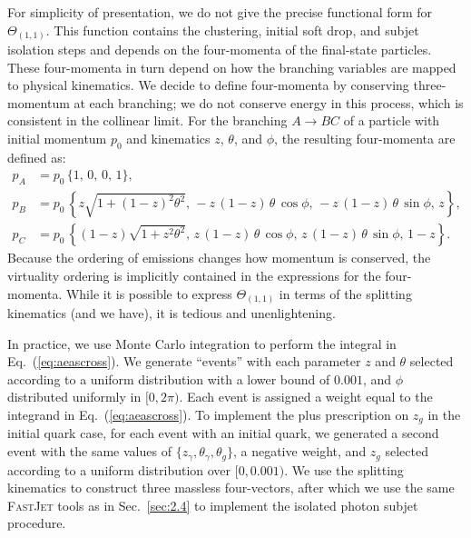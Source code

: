 \documentclass[a4paper,11pt]{article}
\DeclareRobustCommand{\Sec}[1]{Sec.~\ref{#1}}
\DeclareRobustCommand{\Eq}[1]{Eq.~(\ref{#1})}
\begin{document}
For simplicity of presentation, we do not give the precise functional form for $\Theta_{(1,1)}$.
%
This function contains the clustering, initial soft drop, and subjet isolation steps and depends on the four-momenta of the final-state particles.
%
These four-momenta in turn depend on how the branching variables are mapped to physical kinematics.
%
We decide to define four-momenta by conserving three-momentum at each branching; we do not conserve energy in this process, which is consistent in the collinear limit.
%
For the branching $A \to BC$ of a particle with initial momentum $p_0$ and kinematics $z$, $\theta$, and $\phi$, the resulting four-momenta are defined as:
%
\begin{subequations}
\begin{align}
p_{A} &= p_0\, \{1,\, 0,\, 0,\,1\},\\
p_{B} &= p_0\, 
	\left\{z \sqrt{1 + (1-z)^2 \theta^2},\, -z\,(1 - z)\,\theta\, \cos \phi,\, -z\,(1 - z)\,\theta\, \sin \phi,\, z \right\},
\\
p_{C} &= p_0\,
	\left\{(1 - z) \sqrt{1 + z^2 \theta^2},\, z\,(1 - z)\,\theta\, \cos \phi,\, z\,(1 - z)\,\theta\, \sin \phi,\, 1 - z \right\}.
\end{align}
\end{subequations}
%
Because the ordering of emissions changes how momentum is conserved, the virtuality ordering is implicitly contained in the expressions for the four-momenta.
%
While it is possible to express $\Theta_{(1,1)}$ in terms of the splitting kinematics (and we have), it is tedious and unenlightening.

In practice, we use Monte Carlo integration to perform the integral in \Eq{eq:aeascross}.
%
We generate ``events'' with each parameter $z$ and $\theta$ selected according to a uniform distribution with a lower bound of $0.001$, and $\phi$ distributed uniformly in $[0,2\pi)$.
%
Each event is assigned a weight equal to the integrand in \Eq{eq:aeascross}.
%
To implement the plus prescription on $z_g$ in the initial quark case, for each event with an initial quark, we generated a second event with the same values of  $\{z_{\gamma}, \theta_{\gamma}, \theta_g\}$, a negative weight, and $z_g$ selected according to a uniform distribution over $[0,0.001)$.
%
We use the splitting kinematics to construct three massless four-vectors, after which we use the same \textsc{FastJet} tools as in \Sec{sec:2.4} to implement the isolated photon subjet procedure.
\end{document}
